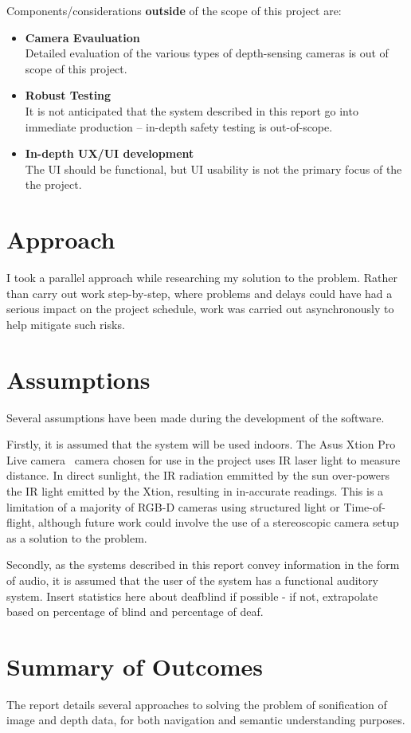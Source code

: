 Components/considerations \textbf{outside} of the scope of this project are:
\begin{itemize}
    \item \textbf{Camera Evauluation} \hfill \\
        Detailed evaluation of the various types of depth-sensing cameras is out of scope of this project. 
    \item \textbf{Robust Testing} \hfill \\
        It is not anticipated that the system described in this report go into immediate production -- in-depth safety testing is out-of-scope. 
    \item \textbf{In-depth UX/UI development} \hfill \\
        The UI should be functional, but UI usability is not the primary focus of the the project. 
\end{itemize}

\section{Approach}
I took a parallel approach while researching my solution to the problem. Rather than carry out work step-by-step, where problems and delays could have had a serious impact on the project schedule, work was carried out asynchronously to help mitigate such risks. 

\section{Assumptions}
Several assumptions have been made during the development of the software.

Firstly, it is assumed that the system will be used indoors. The Asus Xtion Pro Live camera~\cite{xtion} camera chosen for use in the project uses \ac{IR} laser light to measure distance. In direct sunlight, the \ac{IR} radiation emmitted by the sun over-powers the \ac{IR} light emitted by the Xtion, resulting in in-accurate readings. This is a limitation of a majority of \ac{RGB-D} cameras using structured light or Time-of-flight, although future work could involve the use of a stereoscopic camera setup as a solution to the problem.

Secondly, as the systems described in this report convey information in the form of audio, it is assumed that the user of the system has a functional auditory system. Insert statistics here about deafblind if possible - if not, extrapolate based on percentage of blind and percentage of deaf.

\section{Summary of Outcomes}
The report details several approaches to solving the problem of sonification of image and depth data, for both navigation and semantic understanding purposes. 
